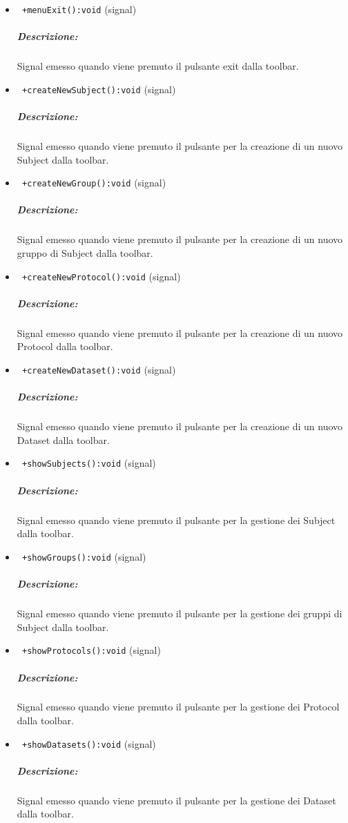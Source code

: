 \begin{itemize}
\item \color{blue}\verb! +menuExit():void! (signal)
\color{black} 
\subparagraph{Descrizione:} Signal\g{} emesso quando viene premuto il pulsante exit dalla toolbar.

\item \color{blue}\verb! +createNewSubject():void! (signal)
\color{black} 
\subparagraph{Descrizione:} Signal\g{} emesso quando viene premuto il pulsante per la creazione di un nuovo Subject\g{} dalla toolbar.

\item \color{blue}\verb! +createNewGroup():void! (signal)
\color{black} 
\subparagraph{Descrizione:} Signal\g{} emesso quando viene premuto il pulsante per la creazione di un nuovo gruppo di Subject\g{} dalla toolbar.

\item \color{blue}\verb! +createNewProtocol():void! (signal)
\color{black} 
\subparagraph{Descrizione:} Signal\g{} emesso quando viene premuto il pulsante per la creazione di un nuovo Protocol\g{} dalla toolbar.

\item \color{blue}\verb! +createNewDataset():void! (signal)
\color{black} 
\subparagraph{Descrizione:} Signal\g{} emesso quando viene premuto il pulsante per la creazione di un nuovo Dataset\g{} dalla toolbar.


\item \color{blue}\verb! +showSubjects():void! (signal)
\color{black} 
\subparagraph{Descrizione:} Signal\g{} emesso quando viene premuto il pulsante per la gestione dei Subject\g{} dalla toolbar.

\item \color{blue}\verb! +showGroups():void! (signal)
\color{black} 
\subparagraph{Descrizione:} Signal\g{} emesso quando viene premuto il pulsante per la gestione dei gruppi di Subject\g{} dalla toolbar.

\item \color{blue}\verb! +showProtocols():void! (signal)
\color{black} 
\subparagraph{Descrizione:} Signal\g{} emesso quando viene premuto il pulsante per la gestione dei Protocol\g{} dalla toolbar.
\item \color{blue}\verb! +showDatasets():void! (signal)
\color{black} 
\subparagraph{Descrizione:} Signal\g{} emesso quando viene premuto il pulsante per la gestione dei Dataset\g{} dalla toolbar.


\end{itemize}

